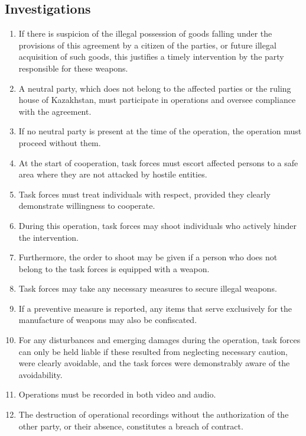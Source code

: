 \documentclass{article}
\begin{document}
\subsection{Investigations}
\begin{enumerate}[(1)]
    \item If there is suspicion of the illegal possession of goods falling under the provisions of this agreement by a citizen of the parties, or future illegal acquisition of such goods, this justifies a timely intervention by the party responsible for these weapons.
    \item A neutral party, which does not belong to the affected parties or the ruling house of Kazakhstan, must participate in operations and oversee compliance with the agreement.
    \item If no neutral party is present at the time of the operation, the operation must proceed without them.
    \item At the start of cooperation, task forces must escort affected persons to a safe area where they are not attacked by hostile entities.
    \item Task forces must treat individuals with respect, provided they clearly demonstrate willingness to cooperate.
    \item During this operation, task forces may shoot individuals who actively hinder the intervention.
    \item Furthermore, the order to shoot may be given if a person who does not belong to the task forces is equipped with a weapon.
    \item Task forces may take any necessary measures to secure illegal weapons.
    \item If a preventive measure is reported, any items that serve exclusively for the manufacture of weapons may also be confiscated.
    \item For any disturbances and emerging damages during the operation, task forces can only be held liable if these resulted from neglecting necessary caution, were clearly avoidable, and the task forces were demonstrably aware of the avoidability.
    \item Operations must be recorded in both video and audio.
    \item The destruction of operational recordings without the authorization of the other party, or their absence, constitutes a breach of contract.
\end{enumerate}
\end{document}
